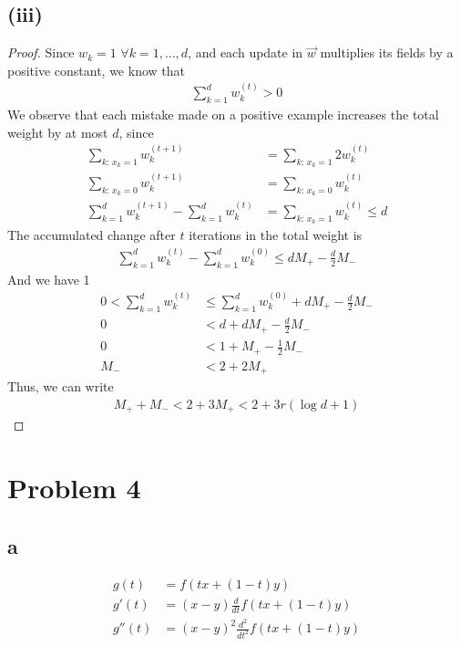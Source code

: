 \documentclass[twoside,11pt]{homework}
\begin{document}
\subsection*{(iii)}
	\begin{proof}
		Since $w_k = 1$ $\forall k = 1,\dots, d$, and each update in $\vec{w}$ multiplies its fields by a positive constant,
		we know that
		\begin{align*}
			\sum_{k=1}^d w_k ^{(t)} > 0
		\end{align*}
		We observe that each mistake made on a positive example increases the total weight by at most $d$, since
		\begin{align*}
			\sum_{k: \,x_k=1} w_k^{(t+1)}  &= \sum_{k: \,x_k=1} 2w_k^{(t)} \\
			\sum_{k: \,x_k=0} w_k^{(t+1)}  &= \sum_{k: \,x_k=0} w_k^{(t)} \\
			\sum_{k=1}^d w_k^{(t+1)}-\sum_{k=1}^d w_k^{(t)} &=   \sum_{k: \,x_k=1} w_k^{(t)} \leq d
		\end{align*}
		The accumulated change after $t$ iterations in the total weight is 
		\begin{align*}
			\sum_{k=1}^d w_k ^{(t)} -\sum_{k=1}^d w_k ^{(0)} \leq d M_+ -\frac{d}{2} M_-
		\end{align*}
		And we have 1
		\begin{align*}
			0<\sum_{k=1}^d w_k ^{(t)} &\leq  \sum_{k=1}^d w_k ^{(0)}  +d M_+ -\frac{d}{2} M_- \\
			0&<d+ d M_+ -\frac{d}{2} M_-\\
			0&<1+  M_+ -\frac{1}{2} M_-\\
			M_- &<2+  2M_+
		\end{align*}
		Thus, we can write
		\begin{align*}
			M_+ + M_-  < 2+ 3M_+< 2+3r(\log{d}+1)
		\end{align*}
	\end{proof}

\section{Problem 4}
\subsection{a}
\begin{align*}
	g(t) &= f(tx+(1-t)y)\\
	g'(t) &= (x-y) \frac{d}{dt} f(tx+(1-t)y)\\
	g''(t) &= (x-y)^2\frac{d^2}{dt^2} f(tx+(1-t)y)\\
\end{align*}
\end{document}
